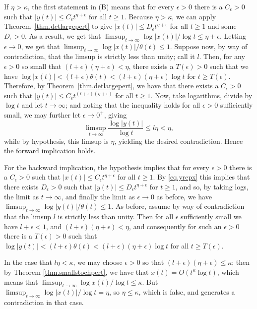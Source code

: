 \documentclass[a4paper,10pt,reqno]{amsart}
\numberwithin{equation}{section}
\theoremstyle{definition}
\theoremstyle{remark}
\DeclareMathOperator{\1}{\mathbbm 1}
\begin{document}
If $\eta>\kappa$, the first statement in (B) means that for every $\epsilon>0$ there is a $C_\epsilon>0$ such that $|y(t)|\leq C_\epsilon t^{\eta+\epsilon}$ for all $t\geq 1$. Because $\eta>\kappa$, we can apply Theorem~\ref{thm.detlargepert} to give $|x(t)|\leq D_\epsilon t^{\eta+\epsilon}$ for all $t\geq 1$ and some $D_\epsilon>0$. As a result, we get that $\limsup_{t\to\infty} \log |x(t)|/\log t\leq \eta+\epsilon$. Letting $\epsilon\to 0$, we get that $\limsup_{t\to\infty} \log|x(t)|/\theta(t)\leq 1$. Suppose now, by way of contradiction, that the limsup is strictly less than unity; call it $l$. Then, for any $\epsilon>0$ so small that $(l+\epsilon)(\eta+\epsilon)<\eta$, there exists a $T(\epsilon)>0$ such that we have $\log |x(t)|< (l+\epsilon)\theta(t) < (l+\epsilon)(\eta+\epsilon) \log t$ for $t\geq T(\epsilon)$. Therefore, by Theorem~\ref{thm.detlargepert}, we have that there exists a $C_\epsilon>0$ such that $|y(t)|\leq C_\epsilon t^{(l+\epsilon)(\eta+\epsilon)}$ for all $t\geq 1$. Now, take logarithms, divide by $\log t$ and let $t\to\infty$; and noting that the inequality holds for all $\epsilon>0$ sufficiently small, we may further let $\epsilon\to 0^+$, giving 
\[
\limsup_{t\to\infty} \frac{\log |y(t)|}{\log t}\leq l\eta<\eta,
\]
while by hypothesis, this limsup is $\eta$, yielding the desired contradiction. Hence the forward implication holds. 

For the backward implication, the hypothesis implies that for every $\epsilon>0$ there is a $C_\epsilon>0$ such that $|x(t)|\leq C_\epsilon t^{\eta+\epsilon}$ for all $t\geq 1$. By \eqref{eq.yrepx} this implies that there exists $D_\epsilon>0$ such that $|y(t)|\leq D_\epsilon t^{\eta+\epsilon}$ for $t\geq 1$, and so, by taking logs, the limit as $t\to\infty$, and finally the limit as $\epsilon\to 0$ as before, we have $\limsup_{t\to\infty} \log |y(t)|/\theta(t)\leq  1$. As before, assume by way of contradiction that the limsup $l$ is strictly less than unity. Then for all $\epsilon$ sufficiently small we have 
$l+\epsilon<1$, and $(l+\epsilon)(\eta+\epsilon)<\eta$, and consequently for such an $\epsilon>0$ there is a $T(\epsilon)>0$ such that $\log|y(t)|<(l+\epsilon)\theta(t)< (l+\epsilon)(\eta+\epsilon)\log t$ for all $t\geq T(\epsilon)$.  

In the case that $l\eta<\kappa$, we may choose $\epsilon>0$ so that $(l+\epsilon)(\eta+\epsilon)\leq \kappa$; then by Theorem \ref{thm.smallstochpert}, we have that $x(t) = O(t^\kappa\log t)$, which means that $\limsup_{t\to\infty}\log x(t)/\log t\leq \kappa$. But $\limsup_{t\to\infty} \log |x(t)|/\log t=\eta$, so $\eta\leq \kappa$, which is false, and generates a contradiction in that case. 
\end{document}

